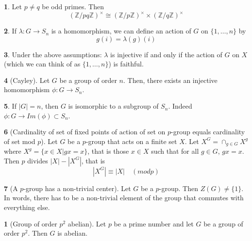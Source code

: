 \documentclass[12pt]{article}
\theoremstyle{definition}
\newtheorem{theorem}{\color{ForestGreen}{\textbf{Theorem}}}
\newtheorem{corollary}{\color{ForestGreen}{\textbf{Corollary}}}
\begin{document}
\begin{theorem}
Let $p \neq q$ be odd primes. Then
\begin{equation}
(\mathbb{Z}/pq \mathbb{Z})^{\times} \cong (\mathbb{Z}/p \mathbb{Z})^{\times} \times (\mathbb{Z}/q \mathbb{Z})^{\times}
\end{equation}
\end{theorem}

\begin{theorem}
If $\lambda : G \to S_n$ is a homomorphism, we can define an action of $G$ on $\{1,\ldots, n\}$ by
\begin{equation}
g(i) = \lambda(g)(i)
\end{equation}
\end{theorem}

\begin{theorem}
Under the above assumptions: $\lambda$ is injective if and only if the action of $G$ on $X$ (which we can think of as $\{1,\ldots, n\}$) is faithful.
\end{theorem}

\begin{theorem}[Cayley]
Let $G$ be a group of order $n$. Then, there exists an injective homomorphism $\phi : G \to S_n$.
\end{theorem}

\begin{theorem}
If $|G| = n$, then $G$ is isomorphic to a subgroup of $S_n$. Indeed $\phi : G \to Im(\phi) \subset S_n$.
\end{theorem}

\begin{theorem}[Cardinality of set of fixed points of action of set on $p$-group equals cardinality of set mod $p$]\label{lemma:favlemma}
Let $G$ be a $p$-group that acts on a finite set $X$. Let $X^G = \cap_{g \in G} X^g$ where $X^g = \{x\in X| gx =x\}$, that is those $x\in X$ such that for all $g\in G$, $gx = x$. Then $p$ divides $|X| - |X^G|$, that is
\begin{equation}
|X^G| \equiv |X| \quad (mod p)
\end{equation}
\end{theorem}

\begin{theorem}[A $p$-group has a non-trivial center]
Let $G$ be a $p$-group. Then $Z(G) \neq \{1\}$.  In words, there has to be a non-trivial element of the group that commutes with everything else.
\end{theorem}

\begin{corollary}[Group of order $p^2$ abelian]
Let $p$ be a prime number and let $G$ be a group of order $p^2$. Then $G$ is abelian.
\end{corollary}
\end{document}
